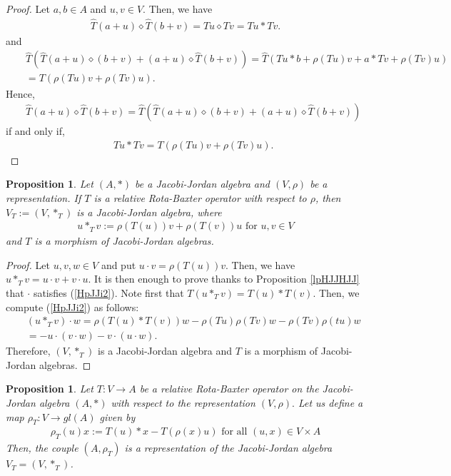 \documentclass[12pt]{amsart}
\newtheorem{proposition}[Theorem]{Proposition}
\begin{document}
	\begin{proof}
		Let $a,b\in A$ and $u,v\in V.$ Then, we have
		\begin{eqnarray}
			\widehat{T}(a+u)\diamond\widehat{T}(b+v)=Tu\diamond Tv=Tu\ast Tv.\nonumber 
		\end{eqnarray}
		and
		\begin{eqnarray}
			&&\widehat{T}(\widehat{T}(a+u)\diamond(b+v)+(a+u)\diamond\widehat{T}(b+v))=\widehat{T}(Tu\ast b+\rho(Tu)v+a\ast Tv+\rho(Tv)u)\nonumber\\
			&&=T(\rho(Tu)v+\rho(Tv)u)\nonumber.
		\end{eqnarray}
		Hence,
		\begin{eqnarray}
			&&\widehat{T}(a+u)\diamond\widehat{T}(b+v)=\widehat{T}(\widehat{T}(a+u)\diamond(b+v)+(a+u)\diamond\widehat{T}(b+v))\nonumber
		\end{eqnarray}
		if and only if,
		\begin{eqnarray}
			&&Tu\ast Tv=T(\rho(Tu)v+\rho(Tv)u).
		\end{eqnarray}	
	\end{proof}
	\begin{proposition}\label{HJJpJJ}
		Let $(A,\ast)$ be a Jacobi-Jordan algebra and $(V, \rho)$ be a representation. If $T$ is
		a relative Rota-Baxter operator with respect to $\rho$, then $V_T:=(V, \ast_T)$ is a Jacobi-Jordan algebra, where
		\begin{eqnarray}
			u\ast_T v:=\rho(T(u))v+ \rho(T(v))u\mbox{ for $u,v\in V$} \label{revasHJJ1}
		\end{eqnarray}
		and $T$ is a morphism of Jacobi-Jordan algebras.
	\end{proposition}
	\begin{proof}
		Let $u, v, w\in V$ and put $u\cdot v=\rho(T(u))v.$ Then, we have
		$u\ast_T v=u\cdot v + v\cdot u.$  It is then enough to prove thanks to Proposition \ref{lpHJJHJJ} that $\cdot$ satisfies (\ref{HpJJi2}). Note
		first that $T(u\ast_T v) = T(u)\ast T(v).$ Then, we compute 
		(\ref{HpJJi2}) as follows:
		\begin{eqnarray}
			&&(u\ast_T v)\cdot w=\rho(T(u)\ast T(v))w-\rho(T u)\rho(Tv)w-\rho(T v)\rho(tu)w\nonumber\\
			&&=-u\cdot(v\cdot w)-v\cdot(u\cdot w).\nonumber
		\end{eqnarray}
		Therefore, $(V, \ast_T)$ is a  Jacobi-Jordan algebra and $T$ is a morphism of Jacobi-Jordan algebras.
	\end{proof}
	\begin{proposition}
		Let $T : V\rightarrow A$ be a relative Rota-Baxter operator on the Jacobi-Jordan algebra $( A, \ast)$ with respect to the representation $(V,\rho).$
		Let us define a map $\rho_T : V\rightarrow  gl(A)$ given by
		\begin{eqnarray}
			\rho_T(u)x:=T(u)\ast x-T(\rho(x)u) \mbox{ for all $(u,x)\in V\times A $}\nonumber
		\end{eqnarray}
		Then, the couple $(A,\rho_T)$ is a representation of the  Jacobi-Jordan algebra $V_T=(V,\ast_T)$.
	\end{proposition}
\end{document}

